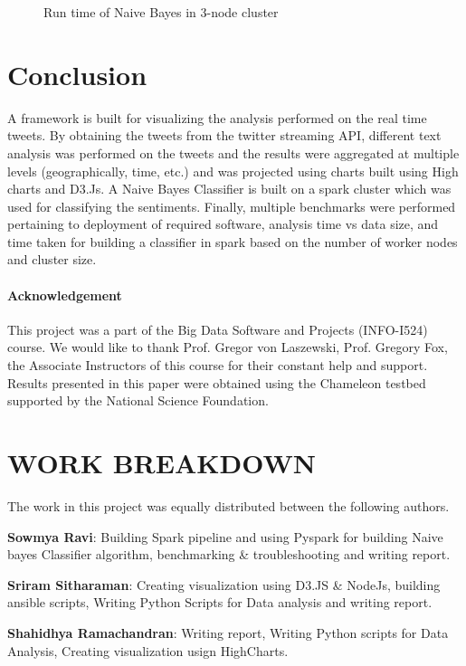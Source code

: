 \documentclass[9pt,twocolumn,twoside]{styles/osajnl}
\begin{document}
\begin{figure}[htbp]
\centering
{}
\caption{Run time of Naive Bayes in 3-node cluster}
\label{fig:chamstat3}
\end{figure}


\section{Conclusion}
A framework is  built for visualizing the analysis performed on the real time tweets. By obtaining the tweets from the twitter streaming API, different text analysis was performed on the tweets and the results were aggregated at multiple levels (geographically, time, etc.) and was projected using charts built using High charts and D3.Js. A Naive Bayes Classifier is built on a spark cluster which was used for classifying the sentiments. Finally, multiple benchmarks were performed pertaining to deployment of required software, analysis time vs data size, and time taken for building a classifier in spark based on the number of worker nodes and cluster size.

\paragraph{Acknowledgement}

This project was a part of the Big Data Software and Projects (INFO-I524) course. We would
like to thank Prof. Gregor von Laszewski, Prof. Gregory Fox, the
Associate Instructors of this course for their constant help and support. Results presented in
this paper were obtained using the Chameleon testbed supported by the
National Science Foundation.

\section{WORK BREAKDOWN}
	The work in this project was equally distributed between the following authors.
	
	\textbf{Sowmya Ravi}: Building Spark pipeline and using Pyspark for building Naive bayes Classifier algorithm, benchmarking \& troubleshooting and writing report.
	
	\textbf{Sriram Sitharaman}: Creating visualization using D3.JS \& NodeJs, building ansible scripts, Writing Python Scripts for Data analysis and writing report.
	
	\textbf{Shahidhya Ramachandran}: Writing report, Writing Python scripts for Data Analysis, Creating visualization usign HighCharts. 
	

\end{document}
